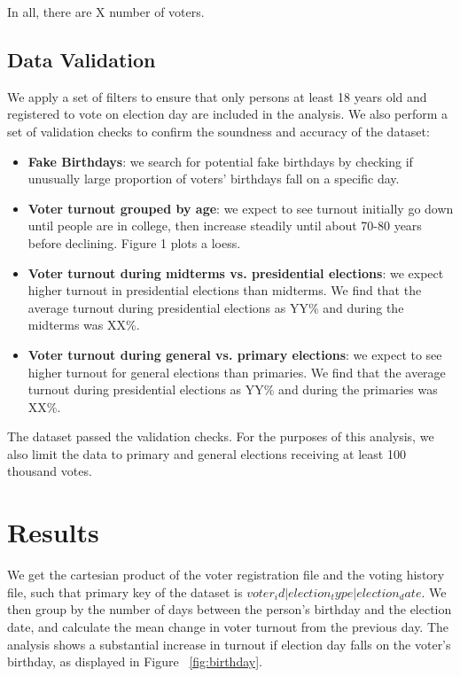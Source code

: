 \documentclass[12pt, letterpaper]{article}
\begin{document}
In all, there are X number of voters. 

\subsection{Data Validation}

We apply a set of filters to ensure that only persons at least 18 years old and registered to vote on election day are included in the analysis. We also perform a set of validation checks to confirm the soundness and accuracy of the dataset: 

\begin{itemize}

	\item \textbf{Fake Birthdays}: we search for potential fake birthdays by checking if unusually large proportion of voters' birthdays fall on a specific day.

	\item \textbf{Voter turnout grouped by age}: we expect to see turnout initially go down until people are in college, then increase steadily until about 70-80 years before declining. Figure 1 plots a loess.  

	\item \textbf{Voter turnout during midterms vs. presidential elections}: we expect higher turnout in presidential elections than midterms. We find that the average turnout during presidential elections as YY\% and during the midterms was XX\%. 

	\item \textbf{Voter turnout during general vs. primary elections}: we expect to see higher turnout for general elections than primaries. We find that the average turnout during presidential elections as YY\% and during the primaries was XX\%. 

\end{itemize}


The dataset passed the validation checks. For the purposes of this analysis, we also limit the data to primary and general elections receiving at least 100 thousand votes. 

\section{Results}
We get the cartesian product of the voter registration file and the voting history file, such that primary key of the dataset is $voter_id | election_type | election_date$. We then group by the number of days between the person's birthday and the election date, and calculate the mean change in voter turnout from the previous day. The analysis shows a substantial increase in turnout if election day falls on the voter’s birthday, as displayed in Figure ~\ref{fig:birthday}.
\end{document}
